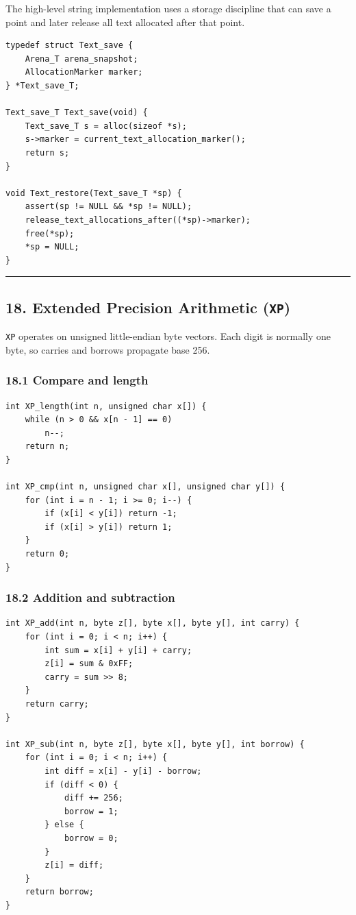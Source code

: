 \documentclass[11pt]{article}
\begin{document}
The high-level string implementation uses a storage discipline that can save a point and later release all text allocated after that point.

\begin{verbatim}
typedef struct Text_save {
    Arena_T arena_snapshot;
    AllocationMarker marker;
} *Text_save_T;

Text_save_T Text_save(void) {
    Text_save_T s = alloc(sizeof *s);
    s->marker = current_text_allocation_marker();
    return s;
}

void Text_restore(Text_save_T *sp) {
    assert(sp != NULL && *sp != NULL);
    release_text_allocations_after((*sp)->marker);
    free(*sp);
    *sp = NULL;
}
\end{verbatim}

\begin{center}\rule{0.5\linewidth}{0.5pt}\end{center}

\subsection{\texorpdfstring{18. Extended Precision Arithmetic (\texttt{XP})}{18. Extended Precision Arithmetic (XP)}}\label{extended-precision-arithmetic-xp}

\texttt{XP} operates on unsigned little-endian byte vectors. Each digit is normally one byte, so carries and borrows propagate base 256.

\subsubsection{18.1 Compare and length}\label{compare-and-length}

\begin{verbatim}
int XP_length(int n, unsigned char x[]) {
    while (n > 0 && x[n - 1] == 0)
        n--;
    return n;
}

int XP_cmp(int n, unsigned char x[], unsigned char y[]) {
    for (int i = n - 1; i >= 0; i--) {
        if (x[i] < y[i]) return -1;
        if (x[i] > y[i]) return 1;
    }
    return 0;
}
\end{verbatim}

\subsubsection{18.2 Addition and subtraction}\label{addition-and-subtraction}

\begin{verbatim}
int XP_add(int n, byte z[], byte x[], byte y[], int carry) {
    for (int i = 0; i < n; i++) {
        int sum = x[i] + y[i] + carry;
        z[i] = sum & 0xFF;
        carry = sum >> 8;
    }
    return carry;
}

int XP_sub(int n, byte z[], byte x[], byte y[], int borrow) {
    for (int i = 0; i < n; i++) {
        int diff = x[i] - y[i] - borrow;
        if (diff < 0) {
            diff += 256;
            borrow = 1;
        } else {
            borrow = 0;
        }
        z[i] = diff;
    }
    return borrow;
}
\end{verbatim}
\end{document}
